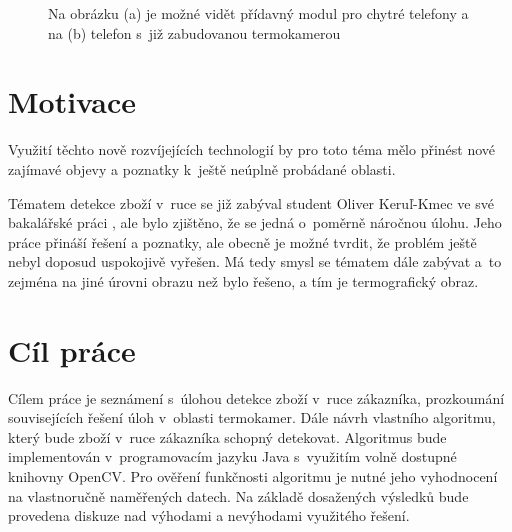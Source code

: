 \begin{introduction}
\begin{figure}
    \qquad
    \caption{Na obrázku (a) je možné vidět přídavný modul pro chytré telefony a na (b) telefon s~již zabudovanou termokamerou}
    \label{fig:example}
\end{figure}

	\section{Motivace}
	Využití těchto nově rozvíjejících technologií by pro toto téma mělo přinést nové zajímavé objevy a poznatky k~ještě neúplně probádané oblasti. 
    
    Tématem detekce zboží v~ruce se již zabýval student Oliver Keruľ-Kmec ve své bakalářské práci \cite{kerul2016detekce}, ale bylo zjištěno, že se jedná o~poměrně náročnou úlohu. Jeho práce přináší řešení a poznatky, ale obecně je možné tvrdit, že problém ještě nebyl doposud uspokojivě vyřešen. Má tedy smysl se tématem dále zabývat a~to zejména na jiné úrovni obrazu než bylo řešeno, a tím je termografický obraz.
	
	\section{Cíl práce}
    Cílem práce je seznámení s~úlohou detekce zboží v~ruce zákazníka, prozkoumání souvisejících řešení úloh v~oblasti termokamer. Dále návrh vlastního algoritmu, který bude zboží v~ruce zákazníka schopný detekovat. Algoritmus bude implementován v~programovacím jazyku Java s~využitím volně dostupné knihovny OpenCV. Pro ověření funkčnosti algoritmu je nutné jeho vyhodnocení na vlastnoručně naměřených datech. Na základě dosažených výsledků bude provedena diskuze nad výhodami a nevýhodami využitého řešení.
    

\end{introduction}
